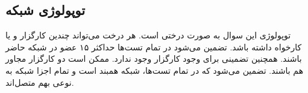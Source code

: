
\subsection{توپولوژی شبکه}
توپولوژی این سوال به صورت درختی است. هر درخت می‌تواند چندین کارگزار و یا کارخواه داشته باشد. تضمین می‌شود در تمام تست‌ها حداکثر ۱۵ عضو در شبکه حاضر باشند. همچنین تضمینی برای وجود کارگزار وجود ندارد. ممکن است دو کارگزار مجاور هم باشند. تضمین می‌شود که در تمام تست‌ها، شبکه همبند است و تمام اجزا شبکه به نوعی بهم متصل‌اند.